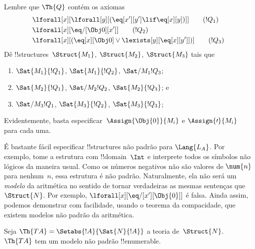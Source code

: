 \documentclass[../../../include/open-logic-section]{subfiles}
\begin{document}
\begin{prob}
Lembre que $\Th{Q}$ contém os axiomas
\begin{align*}
& \lforall[x][\lforall[y][(\eq[x'][y'] \lif \eq[x][y])]] \tag{$!Q_1$}\\
& \lforall[x][\eq/[\Obj 0][x']] \tag{$!Q_2$}\\
& \lforall[x][(\eq[x][\Obj 0] \lor \lexists[y][\eq[x][y']])] \tag{$!Q_3$}
\end{align*}
Dê !!{structure}s~$\Struct{M_1}$, $\Struct{M_2}$, $\Struct{M_3}$ tais que
\begin{enumerate}
\item $\Sat{M_1}{!Q_1}$, $\Sat{M_1}{!Q_2}$, $\Sat/{M_1}{!Q_3}$;
\item $\Sat{M_2}{!Q_1}$, $\Sat/{M_2}{!Q_2}$, $\Sat{M_2}{!Q_3}$; e
\item $\Sat/{M_3}{!Q_1}$, $\Sat{M_3}{!Q_2}$, $\Sat{M_3}{!Q_3}$;
\end{enumerate}
Evidentemente, basta especificar~$\Assign{\Obj{0}}{M_i}$ e
$\Assign{\prime}{M_i}$ para cada uma.
\end{prob}

\begin{explain}
É bastante fácil especificar !!{structure}s não padrão para
$\Lang{L_A}$. Por exemplo, tome a estrutura com !!{domain}~$\Int$ e
interprete todos os símbolos não lógicos da maneira usual. Como os
números negativos não são valores de $\num{n}$ para nenhum~$n$, essa
estrutura é não padrão. Naturalmente, ela não será um \emph{modelo} da
aritmética no sentido de tornar verdadeiras as mesmas sentenças que
$\Struct{N}$. Por exemplo, $\lforall[x][\eq/[x'][\Obj{0}]]$ é falsa.
Ainda assim, podemos demonstrar com facilidade, usando o teorema da
compacidade, que existem modelos não padrão da aritmética.
\end{explain}

\begin{prop}
Seja $\Th{TA} = \Setabs{!A}{\Sat{N}{!A}}$ a teoria
de~$\Struct{N}$. $\Th{TA}$ tem um modelo não padrão !!{enumerable}.
\end{prop}
\end{document}
